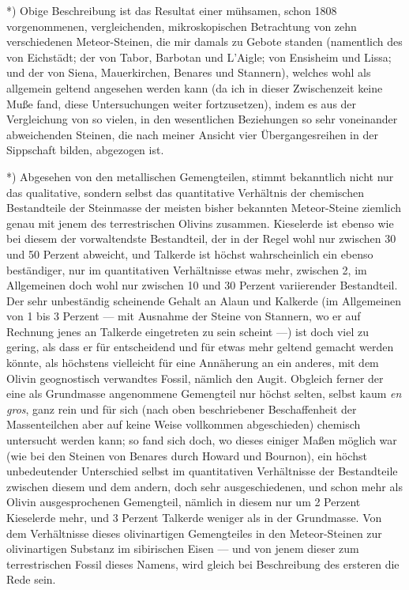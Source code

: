 \documentclass[a4paper, 11pt, oneside, german]{article}
\begin{document}
*) Obige Beschreibung ist das Resultat einer mühsamen, schon 1808 vorgenommenen, vergleichenden, mikroskopischen Betrachtung von zehn verschiedenen Meteor-Steinen, die mir damals zu Gebote standen (namentlich des von Eichstädt; der von Tabor, Barbotan und L'Aigle; von Ensisheim und Lissa; und der von Siena, Mauerkirchen, Benares und Stannern), welches wohl als allgemein geltend angesehen werden kann (da ich in dieser Zwischenzeit keine Muße fand, diese Untersuchungen weiter fortzusetzen), indem es aus der Vergleichung von so vielen, in den wesentlichen Beziehungen so sehr voneinander abweichenden Steinen, die nach meiner Ansicht vier Übergangesreihen in der Sippschaft bilden, abgezogen ist.

*) Abgesehen von den metallischen Gemengteilen, stimmt bekanntlich nicht nur das qualitative, sondern selbst das quantitative Verhältnis der chemischen Bestandteile der Steinmasse der meisten bisher bekannten Meteor-Steine ziemlich genau mit jenem des terrestrischen Olivins zusammen. Kieselerde ist ebenso wie bei diesem der vorwaltendste Bestandteil, der in der Regel wohl nur zwischen 30 und 50 Perzent abweicht, und Talkerde ist höchst wahrscheinlich ein ebenso beständiger, nur im quantitativen Verhältnisse etwas mehr, zwischen 2, im Allgemeinen doch wohl nur zwischen 10 und 30 Perzent variierender Bestandteil. Der sehr unbeständig scheinende Gehalt an Alaun und Kalkerde (im Allgemeinen von 1 bis 3 Perzent --- mit Ausnahme der Steine von Stannern, wo er auf Rechnung jenes an Talkerde eingetreten zu sein scheint ---) ist doch viel zu gering, als dass er für entscheidend und für etwas mehr geltend gemacht werden könnte, als höchstens vielleicht für eine Annäherung an ein anderes, mit dem Olivin geognostisch verwandtes Fossil, nämlich den Augit.  
Obgleich ferner der eine als Grundmasse angenommene Gemengteil nur höchst selten, selbst kaum \emph{en gros}, ganz rein und für sich (nach oben beschriebener Beschaffenheit der Massenteilchen aber auf keine Weise vollkommen abgeschieden) chemisch untersucht werden kann; so fand sich doch, wo dieses einiger Maßen möglich war (wie bei den Steinen von Benares durch Howard und Bournon), ein höchst unbedeutender Unterschied selbst im quantitativen Verhältnisse der Bestandteile zwischen diesem und dem andern, doch sehr ausgeschiedenen, und schon mehr als Olivin ausgesprochenen Gemengteil, nämlich in diesem nur um 2 Perzent Kieselerde mehr, und 3 Perzent Talkerde weniger als in der Grundmasse.  
Von dem Verhältnisse dieses olivinartigen Gemengteiles in den Meteor-Steinen zur olivinartigen Substanz im sibirischen Eisen --- und von jenem dieser zum terrestrischen Fossil dieses Namens, wird gleich bei Beschreibung des ersteren die Rede sein.
\end{document}
